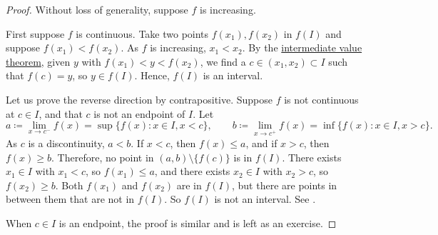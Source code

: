\begin{proof}
Without loss of generality, suppose $f$ is increasing.

First suppose $f$ is continuous.  Take two points
$f(x_1), f(x_2)$ in $f(I)$ and suppose
$f(x_1) < f(x_2)$.
As $f$ is increasing, $x_1 < x_2$.  By the
\hyperref[IVT:thm]{intermediate value theorem},
given $y$ with $f(x_1) < y < f(x_2)$, we find
a $c \in (x_1,x_2) \subset I$ such that $f(c) = y$, so $y \in f(I)$. 
Hence, $f(I)$ is an interval.

Let us prove the reverse direction by contrapositive.
Suppose $f$ is not continuous at $c \in I$,
and that $c$ is not an endpoint of $I$.
Let
\begin{equation*}
a
\coloneqq \lim_{x \to c^-} f(x) = \sup \bigl\{ f(x) : x \in I, x < c \bigr\} ,
\qquad
b
\coloneqq \lim_{x \to c^+} f(x) = \inf \bigl\{ f(x) : x \in I, x > c \bigr\} .
\end{equation*}
As $c$ is a discontinuity, $a < b$.
If $x < c$, then $f(x) \leq a$, and
if $x > c$, then $f(x) \geq b$.  Therefore,
no point
in $(a,b) \setminus \bigl\{ f(c) \bigr\}$ is in $f(I)$.
There exists $x_1 \in I$ with $x_1 < c$, so
$f(x_1) \leq a$, and there exists $x_2 \in I$ with $x_2 > c$,
so $f(x_2) \geq b$.  Both $f(x_1)$ and $f(x_2)$ are in $f(I)$,
but there are points in between them that are not in $f(I)$.
So $f(I)$ is not an interval.  See .

When $c \in I$ is an endpoint, the proof is similar and is left as an exercise.
\end{proof}

\begin{myfigureht}
\caption{Increasing function $f \colon I \to \R$ discontinuity at
$c$.\label{fig:figinccont}}
\end{myfigureht}

